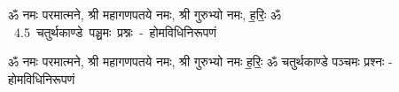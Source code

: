 \documentclass[17pt]{extarticle}
\begin{document}
\begin{titlepage}
    \begin{center}
 
\begin{sanskrit}
    { \Large
    ॐ नमः परमात्मने, श्री महागणपतये नमः, 
श्री गुरुभ्यो नमः, ह॒रिः॒ ॐ 
    }
    \\
    \vspace{2.5cm}
    \mbox{ \Huge
    4.5      चतुर्थकाण्डे पञ्चमः प्रश्नः - होमविधिनिरूपणं   }
\end{sanskrit}
\end{center}

\end{titlepage}
\tableofcontents

ॐ नमः परमात्मने, श्री महागणपतये नमः, श्री गुरुभ्यो नमः ह॒रिः॒ ॐ       चतुर्थकाण्डे पञ्चमः प्रश्नः - होमविधिनिरूपणं \newline

\end{document}

